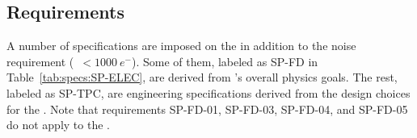 \subsection{Requirements}
\label{sec:fdsp-tpcelec-overview-requirements}

A number of specifications are imposed on the  in addition to the noise requirement (~$<\SI{1000}{e^-}$). 
Some of them, labeled as SP-FD in Table~\ref{tab:specs:SP-ELEC},
are derived from 's overall physics goals. %
The rest, labeled
as SP-TPC, are engineering specifications derived from the design choices for the . %
Note that requirements SP-FD-01, SP-FD-03, SP-FD-04, and SP-FD-05 do not 
apply to the . %



